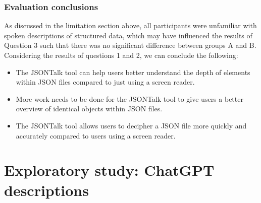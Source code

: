 \documentclass{l4proj}
\begin{document}
\subsection{Evaluation conclusions}

As discussed in the limitation section above, all participants were unfamiliar with spoken descriptions of structured data, which may have influenced the results of Question 3 such that there was no significant difference between groups A and B. Considering the results of questions 1 and 2, we can conclude the following:
\begin{itemize}
    \item The JSONTalk tool can help users better understand the depth of elements within JSON files compared to just using a screen reader.
    \item  More work needs to be done for the JSONTalk tool to give users a better overview of identical objects within JSON files.
    \item  The JSONTalk tool allows users to decipher a JSON file more quickly and accurately compared to users using a screen reader.
\end{itemize}



\chapter{Exploratory study: ChatGPT descriptions}

\end{document}
